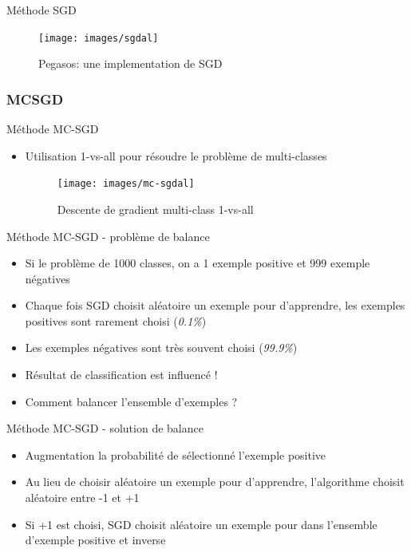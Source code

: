 \documentclass[11pt]{beamer}
\begin{document}
\begin{otherlanguage}{french}
\begin{frame}{Méthode SGD}
\begin{figure}[ht!]
\centering
\texttt{[image: images/sgdal]}
\caption{Pegasos: une implementation de SGD}
\label{al:sgd}
\end{figure}

\end{frame}

\subsubsection*{MCSGD}
\begin{frame}{Méthode MC-SGD}
\begin{itemize}
\item Utilisation 1-vs-all pour résoudre le problème de multi-classes

\begin{figure}[ht!]
\centering
\texttt{[image: images/mc-sgdal]}
\caption{Descente de gradient multi-class 1-vs-all}
\label{al:mc-sgd}
\end{figure}

\end{itemize}

\end{frame}

\begin{frame}{Méthode MC-SGD - problème de balance}
\begin{itemize}
\item Si le problème de 1000 classes, on a 1 exemple positive et 999 exemple négatives
\item Chaque fois SGD choisit aléatoire un exemple pour d'apprendre, les exemples positives sont rarement choisi (\emph{0.1\%})
\item Les exemples négatives sont très souvent choisi (\emph{99.9\%})
\item Résultat de classification est influencé !
\item Comment balancer l'ensemble d'exemples ?
\end{itemize}
\end{frame}

\begin{frame}{Méthode MC-SGD - solution de balance}
\begin{itemize}
\item Augmentation la probabilité de sélectionné l'exemple positive
\item Au lieu de choisir aléatoire un exemple pour d'apprendre, l'algorithme choisit aléatoire entre -1 et +1
\item Si +1 est choisi, SGD choisit aléatoire un exemple pour dans l'ensemble d'exemple positive et inverse
\end{itemize}
\end{frame}


\end{otherlanguage}
\end{document}
